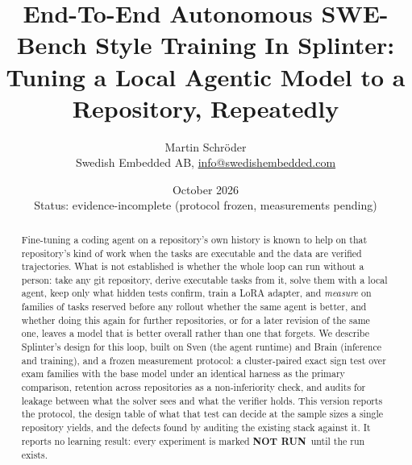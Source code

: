 \documentclass[11pt,a4paper]{article}
\title{End-To-End Autonomous SWE-Bench Style Training In Splinter:\\
Tuning a Local Agentic Model to a Repository, Repeatedly}
\author{Martin Schröder\\
Swedish Embedded AB, \href{mailto:info@swedishembedded.com}{info@swedishembedded.com}}
\date{October 2026 \\ \small Status: evidence-incomplete (protocol frozen, measurements pending)}
\newcommand{\notrun}{\textbf{NOT RUN}}
\begin{document}
\maketitle

\begin{abstract}
Fine-tuning a coding agent on a repository's own history is known to help on that
repository's kind of work when the tasks are executable and the data are verified
trajectories. What is not established is whether the whole loop can run without a
person: take any git repository, derive executable tasks from it, solve them with a
local agent, keep only what hidden tests confirm, train a LoRA adapter, and
\emph{measure} on families of tasks reserved before any rollout whether the same agent
is better, and whether doing this again for further repositories, or for a later
revision of the same one, leaves a model that is better overall rather than one that
forgets. We describe Splinter's design for this loop, built on Sven (the agent runtime)
and Brain (inference and training), and a frozen measurement protocol: a
cluster-paired exact sign test over exam families with the base model under an identical
harness as the primary comparison, retention across repositories as a non-inferiority
check, and audits for leakage between what the solver sees and what the verifier
holds. This version reports the protocol, the design table of what that test can decide
at the sample sizes a single repository yields, and the defects found by auditing the
existing stack against it. It reports no learning result: every experiment is marked
\notrun\ until the run exists.
\end{abstract}












\end{document}
